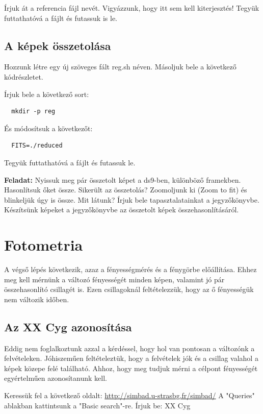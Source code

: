 \documentclass{article}
\begin{document}
Írjuk át a referencia fájl nevét. Vigyázzunk, hogy itt sem kell kiterjesztés!
Tegyük futtathatóvá a fájlt és futassuk is le.

\subsection{A képek összetolása}

Hozzunk létre egy új szöveges fált reg.sh néven. Másoljuk bele a következő
kódrészletet.

Írjuk bele a következő sort:
\begin{verbatim}
  mkdir -p reg
\end{verbatim}

És módosítsuk a következőt:

\begin{verbatim}
  FITS=./reduced
\end{verbatim}

Tegyük futtathatóvá a fájlt és futassuk le.

{\bf Feladat:}
Nyissuk meg pár összetolt képet a ds9-ben, különböző framekben. Hasonlítsuk
őket össze. Sikerült az összetolás? Zoomoljunk ki (Zoom to fit) és blinkeljük
úgy is össze. Mit látunk? Írjuk bele tapasztalatainkat a jegyzőkönyvbe.
Készítsünk képeket a jegyzőkönyvbe az összetolt képek összehasonlításáról.

\section{Fotometria}

A végső lépés következik, azaz a fényességmérés és a fénygörbe előállítása.
Ehhez meg kell mérnünk a változó fényességét minden képen, valamint jó pár
összehasonlító csillagét is. Ezen csillagoknál feltételezzük, hogy az ő
fényességük nem változik időben.

\subsection{Az XX Cyg azonosítása}

Eddig nem foglalkoztunk azzal a kérdéssel, hogy hol van pontosan a változónk a
felvételeken. Jóhiszeműen feltételeztük, hogy a felvételek jók és a csillag
valahol a képek közepe felé található. Ahhoz, hogy meg tudjuk mérni a célpont
fényességét egyértelműen azonosítanunk kell.

Keressük fel a következő oldalt:
\url{http://simbad.u-strasbg.fr/simbad/} A "Queries" ablakban kattintsunk a
"Basic search"-re. Írjuk be: XX Cyg
\end{document}
